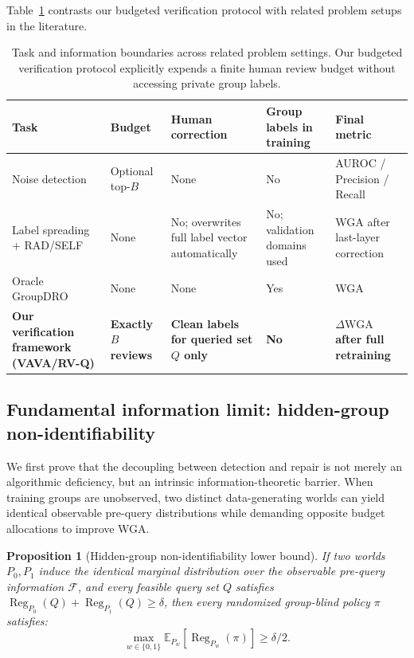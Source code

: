 \documentclass{article}
\newcommand{\dwga}{\ensuremath{\Delta\mathrm{WGA}}}
\newtheorem{proposition}[theorem]{Proposition}
\begin{document}
Table~\ref{tab:task-boundaries} contrasts our budgeted verification protocol with related problem setups in the literature.

\begin{table}[t]
\caption{Task and information boundaries across related problem settings. Our budgeted verification protocol explicitly expends a finite human review budget without accessing private group labels.}
\label{tab:task-boundaries}
\centering
\scriptsize
\setlength{\tabcolsep}{2.4pt}
\begin{tabular}{>{\raggedright\arraybackslash}p{}
                >{\raggedright\arraybackslash}p{}
                >{\raggedright\arraybackslash}p{}
                >{\raggedright\arraybackslash}p{}
                >{\raggedright\arraybackslash}p{}}
\toprule
Task & Budget & Human correction & Group labels in training & Final metric \\
\midrule
Noise detection & Optional top-$B$ & None & No & AUROC / Precision / Recall \\
Label spreading + RAD/SELF \citep{stromberg2024enhancing} & None & No; overwrites full label vector automatically & No; validation domains used & WGA after last-layer correction \\
Oracle GroupDRO \citep{sagawa2019distributionally} & None & None & Yes & WGA \\
\textbf{Our verification framework (VAVA/RV-Q)} & \textbf{Exactly $B$ reviews} & \textbf{Clean labels for queried set $Q$ only} & \textbf{No} & \textbf{$\dwga$ after full retraining} \\
\bottomrule
\end{tabular}
\end{table}

\subsection{Fundamental information limit: hidden-group non-identifiability}
\label{sec:theory_limit}

We first prove that the decoupling between detection and repair is not merely an algorithmic deficiency, but an intrinsic information-theoretic barrier. When training groups are unobserved, two distinct data-generating worlds can yield identical observable pre-query distributions while demanding opposite budget allocations to improve WGA.

\begin{proposition}[Hidden-group non-identifiability lower bound]
\label{prop:two-world}
If two worlds $P_0,P_1$ induce the identical marginal distribution over the observable pre-query information $\mathcal F$, and every feasible query set $Q$ satisfies $\operatorname{Reg}_{P_0}(Q)+\operatorname{Reg}_{P_1}(Q)\geq\delta$, then every randomized group-blind policy $\pi$ satisfies:
\begin{equation}
  \max_{w\in\{0,1\}}\mathbb E_{P_w}[\operatorname{Reg}_{P_w}(\pi)]\geq\delta/2.
\end{equation}
\end{proposition}
\end{document}

